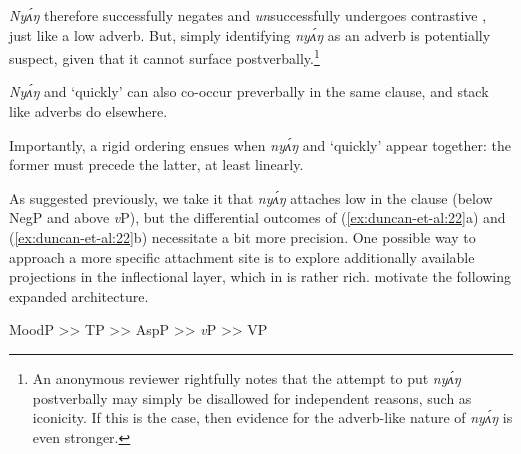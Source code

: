 \documentclass[output=paper,modfonts,nonflat,
]{langsci/langscibook}
\begin{document}
\label{ex:duncan-et-al:21}
\z

\noindent \textit{Ny\'{ʌ}ŋ} therefore successfully negates and \textit{un}successfully undergoes contrastive , just like a low adverb. But, simply identifying \textit{ny\'{ʌ}ŋ} as an adverb is potentially suspect, given that it cannot surface postverbally.\footnote{An anonymous reviewer rightfully notes that the attempt to put \textit{ny\'{ʌ}ŋ} postverbally may simply be disallowed for independent reasons, such as iconicity. If this is the case, then evidence for the adverb-like nature of \textit{ny\'{ʌ}ŋ} is even stronger.}

\textit{Ny\'{ʌ}ŋ} and `quickly' can also co-occur preverbally in the same clause, and stack like adverbs do elsewhere.

\ea\label{ex:duncan-et-al:22}
\z
\z

\noindent Importantly, a rigid ordering ensues when \textit{ny\'{ʌ}ŋ} and `quickly' appear together: the former must precede the latter, at least linearly.

As suggested previously, we take it that \textit{ny\'{ʌ}ŋ} attaches low in the clause (below NegP and above \textit{v}P), but the differential outcomes of (\ref{ex:duncan-et-al:22}a) and (\ref{ex:duncan-et-al:22}b) necessitate a bit more precision. One possible way to approach a more specific attachment site is to explore additionally available projections in the inflectional layer, which in  is rather rich. \citet{baker2010agreement} motivate the following expanded architecture.

\ea\label{ex:duncan-et-al:23}
MoodP >> TP >> AspP >> \textit{v}P >> VP
\z
\end{document}
